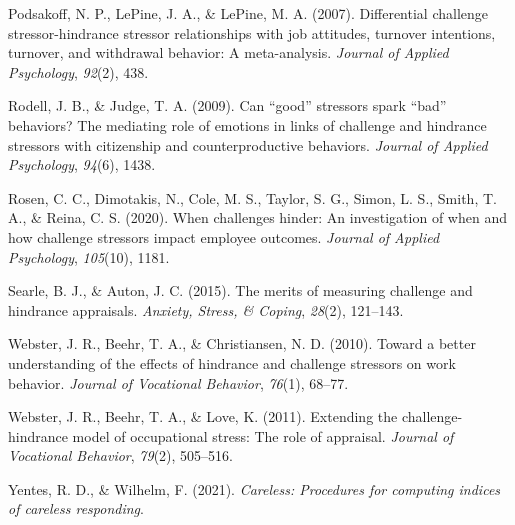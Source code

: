 \documentclass[
  jou,mask]{apa6}
\newlength{\cslhangindent}
\newlength{\cslentryspacingunit} %
\newenvironment{CSLReferences}[2] %
 {%
  \setlength{\parindent}{0pt}
  \ifodd #1
  \let\oldpar\par
  \def\par{\hangindent=\cslhangindent\oldpar}
  \fi
  \setlength{\parskip}{#2\cslentryspacingunit}
 }%
 {}
\begin{document}
\begin{CSLReferences}{1}{0}
\leavevmode{}%
Podsakoff, N. P., LePine, J. A., \& LePine, M. A. (2007). Differential challenge stressor-hindrance stressor relationships with job attitudes, turnover intentions, turnover, and withdrawal behavior: A meta-analysis. \emph{Journal of Applied Psychology}, \emph{92}(2), 438.

\leavevmode{}%
Rodell, J. B., \& Judge, T. A. (2009). Can {``good''} stressors spark {``bad''} behaviors? The mediating role of emotions in links of challenge and hindrance stressors with citizenship and counterproductive behaviors. \emph{Journal of Applied Psychology}, \emph{94}(6), 1438.

\leavevmode{}%
Rosen, C. C., Dimotakis, N., Cole, M. S., Taylor, S. G., Simon, L. S., Smith, T. A., \& Reina, C. S. (2020). When challenges hinder: An investigation of when and how challenge stressors impact employee outcomes. \emph{Journal of Applied Psychology}, \emph{105}(10), 1181.

\leavevmode{}%
Searle, B. J., \& Auton, J. C. (2015). The merits of measuring challenge and hindrance appraisals. \emph{Anxiety, Stress, \& Coping}, \emph{28}(2), 121--143.

\leavevmode{}%
Webster, J. R., Beehr, T. A., \& Christiansen, N. D. (2010). Toward a better understanding of the effects of hindrance and challenge stressors on work behavior. \emph{Journal of Vocational Behavior}, \emph{76}(1), 68--77.

\leavevmode{}%
Webster, J. R., Beehr, T. A., \& Love, K. (2011). Extending the challenge-hindrance model of occupational stress: The role of appraisal. \emph{Journal of Vocational Behavior}, \emph{79}(2), 505--516.

\leavevmode{}%
Yentes, R. D., \& Wilhelm, F. (2021). \emph{Careless: Procedures for computing indices of careless responding}.

\end{CSLReferences}

\endgroup
\end{document}
